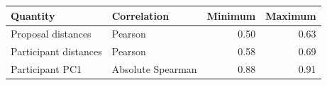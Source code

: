 \begin{tabular}{llrr}
\toprule
Quantity & Correlation & Minimum & Maximum \\
\midrule
Proposal distances & Pearson & 0.50 & 0.63 \\
Participant distances & Pearson & 0.58 & 0.69 \\
Participant PC1 & Absolute Spearman & 0.88 & 0.91 \\
\bottomrule
\end{tabular}
